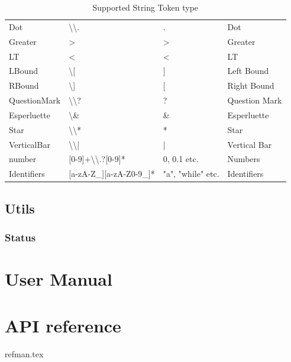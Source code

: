 \documentclass{report}
\newcommand{\+}{}
\begin{document}
\begin{table}[hb!]
\begin{tabular}{l|lll}
            Dot          & \textbackslash{}\textbackslash{}.                      & .                 & Dot            \\
            Greater      & \textgreater{}                                         & \textgreater{}    & Greater        \\
            LT         & \textless{}                                            & \textless{}       & LT           \\
            LBound       & \textbackslash{}[                                      & {]}               & Left Bound     \\
            RBound       & \textbackslash{}]                                      & {[}               & Right Bound    \\
            QuestionMark & \textbackslash{}\textbackslash{}?                      & ?                 & Question Mark  \\
            Esperluette  & \textbackslash{}\&                                     & \&                & Esperluette    \\
            Star         & \textbackslash{}\textbackslash{}*                      & *                 & Star           \\
            VerticalBar  & \textbackslash{}\textbackslash{}|                      & |                 & Vertical Bar   \\
            number       & {[}0-9{]}+\textbackslash{}\textbackslash{}.?{[}0-9{]}* & 0, 0.1 etc.       & Numbers        \\
            Identifiers  & {[}a-zA-Z\_{]}{[}a-zA-Z0-9\_{]}*                       & "a", "while" etc. & Identifiers    \\ \hline
        \end{tabular}
        \caption{Supported String Token type}
        \label{tab:supported_lexical_token_list}
    \end{table}

    \subsection{Utils}\label{subsec:utils}

    \subsubsection{Status }


    \section{User Manual}\label{sec:user-manual}

    \appendix


    \section{API reference }
    {refman.tex}

    \printindex
\end{document}
